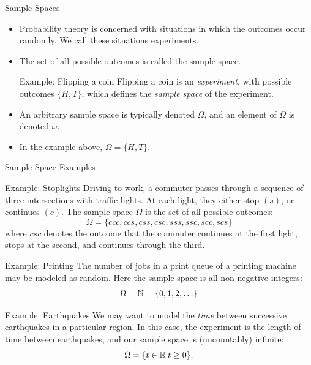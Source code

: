 \begin{frame}{Sample Spaces}

\begin{itemize}
  \item Probability theory is concerned with situations in which the outcomes occur randomly.
We call these situations \alert{experiments}. 

  \item The set of all possible outcomes is called the \alert{sample space}. 

\begin{exampleblock}{Example: Flipping a coin}
  Flipping a coin is an \emph{experiment}, with possible outcomes $\{H, T\}$, which defines the \emph{sample space} of the experiment.
\end{exampleblock}

  \item An arbitrary sample space is typically denoted $\Omega$, and an element of $\Omega$ is denoted $\omega$.

  \item In the example above, $\Omega = \{H, T\}$. 
\end{itemize}

\end{frame}

\begin{frame}[allowframebreaks]{Sample Space Examples}
  \begin{exampleblock}{Example: Stoplights}
    Driving to work, a commuter passes through a sequence of three intersections with traffic lights. At each light, they either stop $(s)$, or continues $(c)$. The sample space $\Omega$ is the set of all possible outcomes: 
    $$
    \Omega = \{ccc, ccs, css, csc, sss, ssc, scc, scs\}
    $$
    where $csc$ denotes the outcome that the commuter continues at the first light, stops at the second, and continues through the third.
  \end{exampleblock}
  
    \begin{exampleblock}{Example: Printing}
      The number of jobs in a print queue of a printing machine may be modeled as random. Here the sample space is all non-negative integers: 
      $$\Omega = \mathbb{N} = \{0, 1, 2, \ldots\}$$
    \end{exampleblock}

  \begin{exampleblock}{Example: Earthquakes}
    We may want to model the \emph{time} between successive earthquakes in a particular region. In this case, the experiment is the length of time between earthquakes, and our sample space is (uncountably) infinite: 
    $$
    \Omega = \{t \in \mathbb{R}| t \geq 0\}. 
    $$
  \end{exampleblock}
\end{frame}

